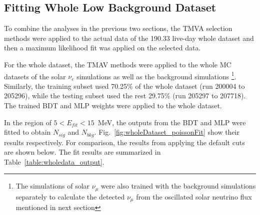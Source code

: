 \subsection{Fitting Whole Low Background Dataset}\label{sect:fitTheWhole}
To combine the analyses in the previous two sections, the TMVA selection methods were applied to the actual data of the 190.33 live-day whole dataset and then a maximum likelihood fit was applied on the selected data. 

For the whole dataset, the TMAV methods were applied to the whole MC datasets of the solar $\nu_e$ simulations as well as the background simulations \footnote{The simulations of solar $\nu_{\mu}$ were also trained with the background simulations separately to calculate the detected $\nu_\mu$ from the oscillated solar neutrino flux mentioned in next section}. Similarly, the training subset used 70.25\% of the whole dataset (run 200004 to 205296), while the testing subset used the rest 29.75\% (run 205297 to 207718). The trained BDT and MLP weights were applied to the whole dataset.

In the region of $5<E_{fit}<15$~MeV, the outputs from the BDT and MLP were fitted to obtain $N_{sig}$ and $N_{bkg}$. Fig.~\ref{fig:wholeDataset_poissonFit} show their results respectively. For comparison, the results from applying the default cuts are shown below. The fit results are summarized in Table~\ref{table:wholedata_output}. 

